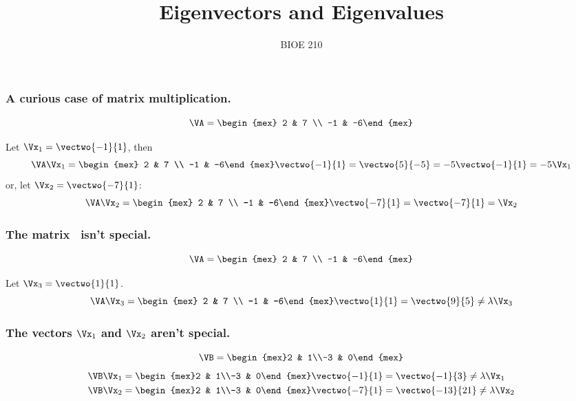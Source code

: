 \documentclass{beamer}
\title{Eigenvectors and Eigenvalues}
\date{}
\author{BIOE 210}
\begin{document}
\maketitle

\begin{frame}
\frametitle{A curious case of matrix multiplication.}

\[ \VA = \begin{mex} 2 & 7 \\ -1 & -6\end{mex} \]

\pause
Let $\Vx_1 = \vectwo{-1}{1}$, then
\[ \VA\Vx_1 = \begin{mex} 2 & 7 \\ -1 & -6\end{mex}\vectwo{-1}{1} = \vectwo{5}{-5} 
= -5\vectwo{-1}{1} = -5\Vx_1 \]
\pause
or, let $\Vx_2 = \vectwo{-7}{1}$:
\[ \VA\Vx_2 = \begin{mex} 2 & 7 \\ -1 & -6\end{mex}\vectwo{-7}{1} = \vectwo{-7}{1} 
 = \Vx_2 \]
\end{frame}

\begin{frame}
\frametitle{The matrix \VA\ isn't special.}

\[ \VA = \begin{mex} 2 & 7 \\ -1 & -6\end{mex} \]

Let $\Vx_3 = \vectwo{1}{1}$.
\[ \VA\Vx_3 = \begin{mex} 2 & 7 \\ -1 & -6\end{mex}\vectwo{1}{1} = \vectwo{9}{5} 
 \ne \lambda\Vx_3 \]
	
\end{frame}

\begin{frame}
\frametitle{The vectors $\Vx_1$ and $\Vx_2$ aren't special.}	

\[ \VB = \begin{mex}2 & 1\\-3 & 0\end{mex} \]
\begin{align*}
	\VB\Vx_1 &= \begin{mex}2 & 1\\-3 & 0\end{mex}\vectwo{-1}{1} = \vectwo{-1}{3} \ne \lambda\Vx_1 \\
	\VB\Vx_2 &= \begin{mex}2 & 1\\-3 & 0\end{mex}\vectwo{-7}{1} = \vectwo{-13}{21} \ne \lambda\Vx_2
\end{align*}
\end{frame}
\end{document}
